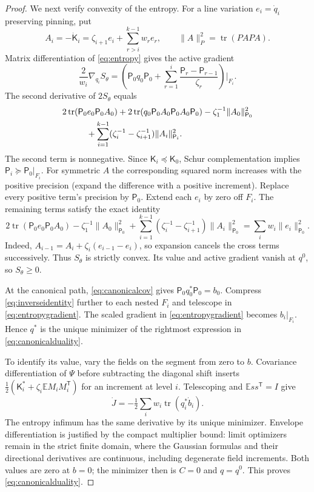 \documentclass[11pt]{article}
\numberwithin{equation}{section}
\theoremstyle{definition}
\newcommand{\E}{\mathbb E}
\newcommand{\tr}{\operatorname{tr}}
\newcommand{\norm}[1]{\lVert #1\rVert}
\begin{document}
\begin{proof}
We next verify convexity of the entropy. For a line variation $e_i=\dot q_i$ preserving pinning, put
\[
A_i=-\dot{\mathsf K}_i=\zeta_{i+1}e_i+\sum_{r>i}^{k-1}w_r e_r,
\qquad \norm A_P^2=\tr(PAPA).
\]
Matrix differentiation of \eqref{eq:entropy} gives the active gradient
\begin{equation}\label{eq:entropygradient}
\frac2{w_i}\nabla_{q_i}S_\theta
=\left(\mathsf P_0q_0\mathsf P_0+
\sum_{r=1}^i\frac{\mathsf P_r-\mathsf P_{r-1}}{\zeta_r}\right)\Big|_{F_i}.
\end{equation}
The second derivative of $2S_\theta$ equals
\begin{align}\label{eq:entropyhessian}
&2\tr(\mathsf P_0e_0\mathsf P_0A_0)
+2\tr(q_0\mathsf P_0A_0\mathsf P_0A_0\mathsf P_0)
-\zeta_1^{-1}\norm{A_0}_{\mathsf P_0}^2\notag\\
&\hspace{1cm}+\sum_{i=1}^{k-1}(\zeta_i^{-1}-\zeta_{i+1}^{-1})
\norm{A_i}_{\mathsf P_i}^2.
\end{align}
The second term is nonnegative. Since $\mathsf K_i\preceq\mathsf K_0$, Schur complementation implies $\mathsf P_i\succeq\mathsf P_0|_{F_i}$. For symmetric $A$ the corresponding squared norm increases with the positive precision (expand the difference with a positive increment). Replace every positive term's precision by $\mathsf P_0$. Extend each $e_i$ by zero off $F_i$. The remaining terms satisfy the exact identity
\[
2\tr(\mathsf P_0e_0\mathsf P_0A_0)
-\zeta_1^{-1}\|A_0\|_{\mathsf P_0}^2
+\sum_{i=1}^{k-1}(\zeta_i^{-1}-\zeta_{i+1}^{-1})
\|A_i\|_{\mathsf P_0}^2
=\sum_iw_i\|e_i\|_{\mathsf P_0}^2.
\]
Indeed, $A_{i-1}=A_i+\zeta_i(e_{i-1}-e_i)$, so expansion cancels the cross terms successively. Thus $S_\theta$ is strictly convex. Its value and active gradient vanish at $q^0$, so $S_\theta\ge0$.

At the canonical path, \eqref{eq:canonicalcov} gives $\mathsf P_0q_0^*\mathsf P_0=b_0$. Compress \eqref{eq:inverseidentity} further to each nested $F_i$ and telescope in \eqref{eq:entropygradient}. The scaled gradient in \eqref{eq:entropygradient} becomes $b_i|_{F_i}$. Hence $q^*$ is the unique minimizer of the rightmost expression in \eqref{eq:canonicalduality}.

To identify its value, vary the fields on the segment from zero to $b$. Covariance differentiation of $\Psi$ before subtracting the diagonal shift inserts $\frac12(\mathsf K_i^*+\zeta_i\E M_iM_i^{\mathsf T})$ for an increment at level $i$. Telescoping and $\E ss^{\mathsf T}=I$ give
\[
\dot J=-\tfrac12\sum_iw_i\tr(q_i^*\dot b_i).
\]
The entropy infimum has the same derivative by its unique minimizer. Envelope differentiation is justified by the compact multiplier bound: limit optimizers remain in the strict finite domain, where the Gaussian formulas and their directional derivatives are continuous, including degenerate field increments. Both values are zero at $b=0$; the minimizer then is $C=0$ and $q=q^0$. This proves \eqref{eq:canonicalduality}.


\end{proof}
\end{document}
